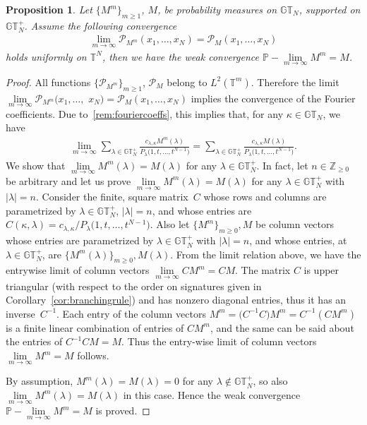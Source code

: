 \documentclass[pdftex]{sigma}
\numberwithin{equation}{section}
\newtheorem{prop}[thm]{Proposition}
\newcommand{\Z}{\mathbb{Z}}
\newcommand{\GT}{\mathbb{GT}}
\newcommand{\GTp}{\mathbb{GT}^+}
\newcommand{\PPP}{\mathcal{P}}
\newcommand{\TT}{\mathbb{T}}
\begin{document}
\begin{prop}\label{prop:lemmaconv}
Let $\{M^m\}_{m \geq 1}$, $M$, be probability measures on $\GT_N$, supported on $\GTp_N$. Assume the following convergence
\begin{gather*}
\lim_{m\rightarrow\infty}{\PPP_{M^m}(x_1, \dots, x_N)} = \PPP_{M}(x_1, \dots, x_N)
\end{gather*}
holds uniformly on $\TT^N$, then we have the weak convergence $\mathbb{P}-\lim\limits_{m\rightarrow\infty}{M^m} = M$.
\end{prop}
\begin{proof}
All functions $\{\PPP_{M^m}\}_{m\geq 1}$, $\PPP_M$ belong to $L^2(\TT^m)$. Therefore the limit $\lim\limits_{m\rightarrow\infty}\PPP_{M^m}(x_1, \dots,$ $ x_N) = \PPP_{M}(x_1, \dots, x_N)$ implies the convergence of the Fourier coef\/f\/icients. Due to~\eqref{rem:fouriercoeffs}, this implies that, for any $\kappa\in\GT_N$, we have
\begin{gather*}
\lim_{m\rightarrow\infty}{ \sum_{\lambda\in\GTp_N}{ \frac{c_{\lambda, \kappa}M^m(\lambda)}{P_{\lambda}\big(1, t, \dots, t^{N-1}\big)} } } = \sum_{\lambda\in\GTp_N}{ \frac{c_{\lambda, \kappa}M(\lambda)}{P_{\lambda}\big(1, t, \dots, t^{N-1}\big)} }.
\end{gather*}
We show that $\lim\limits_{m\rightarrow\infty}{M^m(\lambda)} = M(\lambda)$ for any $\lambda\in\GTp_N$. In fact, let $n\in\Z_{\geq 0}$ be arbitrary and let us prove $\lim\limits_{m\rightarrow\infty}{M^m(\lambda)} = M(\lambda)$ for any $\lambda\in\GTp_N$ with $|\lambda| = n$. Consider the f\/inite, square matrix~$C$ whose rows and columns are parametrized by $\lambda\in\GTp_N$, $|\lambda| = n$, and whose entries are $C(\kappa, \lambda) = c_{\lambda, \kappa}/P_{\lambda}\big(1, t, \dots, t^{N-1}\big)$.
Also let $\{M^m\}_{m\geq 0}, M$ be column vectors whose entries are parametrized by $\lambda\in\GTp_N$ with $|\lambda| = n$, and whose entries, at $\lambda\in\GTp_N$, are $\{M^m(\lambda)\}_{m\geq 0}, M(\lambda)$. From the limit relation above, we have the entrywise limit of column vectors $\lim\limits_{m\rightarrow\infty}{CM^{m}} = CM$. The matrix $C$ is upper triangular (with respect to the order on signatures given in Corollary~\ref{cor:branchingrule}) and has nonzero diagonal entries, thus it has an inverse~$C^{-1}$.
Each entry of the column vectors $M^m = \big(C^{-1}C\big)M^m = C^{-1}(CM^{m})$ is a f\/inite linear combination of entries of $CM^m$, and the same can be said about the entries of $C^{-1}CM = M$. Thus the entry-wise limit of column vectors $\lim\limits_{m\rightarrow\infty}{M^m} = M$ follows.

By assumption, $M^m(\lambda) = M(\lambda) = 0$ for any $\lambda\notin\GTp_N$, so also $\lim\limits_{m\rightarrow\infty}{M^m(\lambda)} = M(\lambda)$ in this case. Hence the weak convergence $\mathbb{P}-\lim\limits_{m\rightarrow\infty}{M^m} = M$ is proved.
\end{proof}
\end{document}
